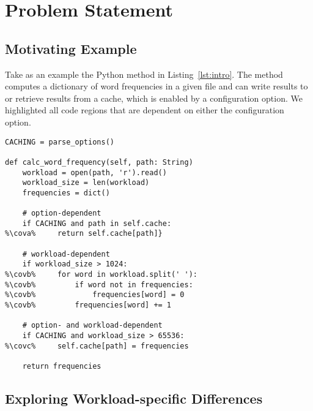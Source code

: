 \section{Problem Statement}
\subsection{Motivating Example}
{\color{black}Take as an example the Python method in Listing~\ref{lst:intro}. The method computes a dictionary of word frequencies in a given file and can write results to or retrieve results from a cache, which is enabled by a configuration option. We highlighted all code regions that are dependent on either the configuration option. }

\begin{lstlisting}[caption={Illustrative code example with one configuration option (line~1), option-dependent behavior (line~10), workload-dependent behavior (lines~14--17), and mixed-dependency behavior (line~21).},label=lst:intro, escapechar=\%]
CACHING = parse_options()
	
def calc_word_frequency(self, path: String)
	workload = open(path, 'r').read()
	workload_size = len(workload)
	frequencies = dict()
	
	# option-dependent
	if CACHING and path in self.cache:
%\cova%		return self.cache[path]}
	
	# workload-dependent
	if workload_size > 1024:	
%\covb%		for word in workload.split(' '):
%\covb%			if word not in frequencies: 
%\covb%				frequencies[word] = 0
%\covb%			frequencies[word] += 1
	
	# option- and workload-dependent
	if CACHING and workload_size > 65536:
%\covc%		self.cache[path] = frequencies
	
	return frequencies
\end{lstlisting}



\subsection{Exploring Workload-specific Differences}

